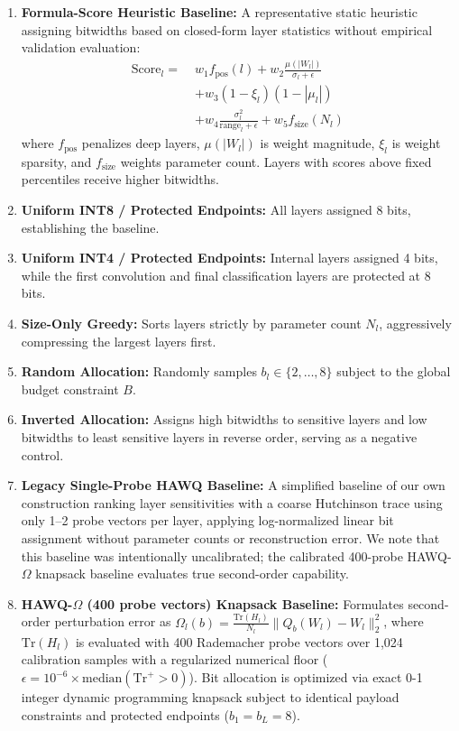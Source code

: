 \documentclass{ieeeaccess}
\begin{document}
\begin{enumerate}
    \item \textbf{Formula-Score Heuristic Baseline:} A representative static heuristic assigning bitwidths based on closed-form layer statistics without empirical validation evaluation:
    \begin{equation}
    \label{eq:formula_score}
    \begin{aligned}
    \text{Score}_l = \; & w_1 f_{\text{pos}}(l) + w_2 \frac{\mu(|W_l|)}{\sigma_l + \epsilon} \\
    & + w_3 (1 - \xi_l)(1 - |\mu_l|) \\
    & + w_4 \frac{\sigma_l^2}{\text{range}_l + \epsilon} + w_5 f_{\text{size}}(N_l)
    \end{aligned}
    \end{equation}
    where $f_{\text{pos}}$ penalizes deep layers, $\mu(|W_l|)$ is weight magnitude, $\xi_l$ is weight sparsity, and $f_{\text{size}}$ weights parameter count. Layers with scores above fixed percentiles receive higher bitwidths.
    \item \textbf{Uniform INT8 / Protected Endpoints:} All layers assigned 8 bits, establishing the baseline.
    \item \textbf{Uniform INT4 / Protected Endpoints:} Internal layers assigned 4 bits, while the first convolution and final classification layers are protected at 8 bits.
    \item \textbf{Size-Only Greedy:} Sorts layers strictly by parameter count $N_l$, aggressively compressing the largest layers first.
    \item \textbf{Random Allocation:} Randomly samples $b_l \in \{2, \dots, 8\}$ subject to the global budget constraint $B$.
    \item \textbf{Inverted Allocation:} Assigns high bitwidths to sensitive layers and low bitwidths to least sensitive layers in reverse order, serving as a negative control.
    \item \textbf{Legacy Single-Probe HAWQ Baseline:} A simplified baseline of our own construction ranking layer sensitivities with a coarse Hutchinson trace using only 1--2 probe vectors per layer, applying log-normalized linear bit assignment without parameter counts or reconstruction error. We note that this baseline was intentionally uncalibrated; the calibrated 400-probe HAWQ-$\Omega$ knapsack baseline evaluates true second-order capability.
    \item \textbf{HAWQ-$\Omega$ (400 probe vectors) Knapsack Baseline:} Formulates second-order perturbation error as $\Omega_l(b) = \frac{\text{Tr}(H_l)}{N_l} \|Q_b(W_l) - W_l\|_2^2$, where $\text{Tr}(H_l)$ is evaluated with 400 Rademacher probe vectors over 1,024 calibration samples with a regularized numerical floor ($\epsilon = 10^{-6} \times \text{median}(\text{Tr}^+ > 0)$). Bit allocation is optimized via exact 0-1 integer dynamic programming knapsack subject to identical payload constraints and protected endpoints ($b_1 = b_L = 8$).

\end{enumerate}
\end{document}
